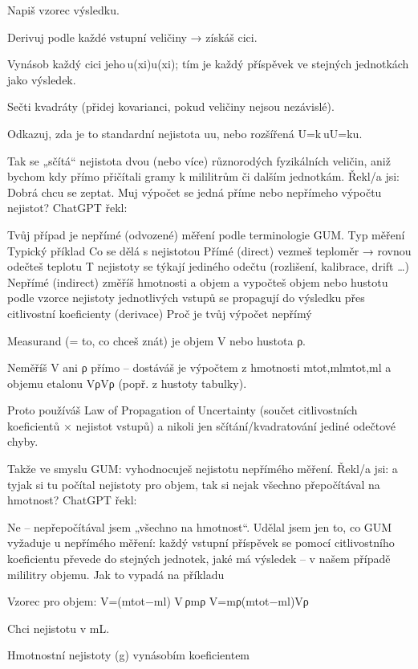 {    Napiš vzorec výsledku.

    Derivuj podle každé vstupní veličiny → získáš cici​.

    Vynásob každý cici​ jeho u(xi)u(xi​); tím je každý příspěvek
    ve stejných jednotkách jako výsledek.

    Sečti kvadráty (přidej kovarianci, pokud veličiny nejsou nezávislé).

    Odkazuj, zda je to standardní nejistota uu, nebo rozšířená U=k uU=ku.

Tak se „sčítá“ nejistota dvou (nebo více) různorodých fyzikálních veličin, aniž bychom kdy přímo přičítali gramy k mililitrům či dalším jednotkám.
Řekl/a jsi:
Dobrá chcu se zeptat. Muj výpočet se jedná příme nebo nepřímeho výpočtu nejistot?
ChatGPT řekl:

Tvůj případ je nepřímé (odvozené) měření podle terminologie GUM.
Typ měření	Typický příklad	Co se dělá s nejistotou
Přímé (direct)	vezmeš teploměr → rovnou odečteš teplotu T	nejistoty se týkají jediného odečtu (rozlišení, kalibrace, drift …)
Nepřímé (indirect)	změříš hmotnosti a objem a vypočteš objem nebo hustotu podle vzorce	nejistoty jednotlivých vstupů se propagují do výsledku přes citlivostní koeficienty (derivace)
Proč je tvůj výpočet nepřímý

    Measurand (= to, co chceš znát) je objem V nebo hustota ρ.

    Neměříš V ani ρ přímo – dostáváš je výpočtem z hmotnosti mtot,mlmtot​,ml​ a objemu etalonu VρVρ​ (popř. z hustoty tabulky).

    Proto používáš Law of Propagation of Uncertainty (součet citlivostních koeficientů × nejistot vstupů) a nikoli jen sčítání/kvadratování jediné odečtové chyby.

Takže ve smyslu GUM: vyhodnocuješ nejistotu nepřímého měření.
Řekl/a jsi:
a tyjak si tu počítal nejistoty pro objem, tak si nejak všechno přepočítával na hmotnost?
ChatGPT řekl:

Ne – nepřepočítával jsem „všechno na hmotnost“.
Udělal jsem jen to, co GUM vyžaduje u nepřímého měření: každý vstupní příspěvek se pomocí citlivostního koeficientu převede do stejných jednotek, jaké má výsledek – v našem případě mililitry objemu.
Jak to vypadá na příkladu

Vzorec pro objem:
V=(mtot−ml)  V ⁣ρmρ
V=mρ​(mtot​−ml​)Vρ​​

    Chci nejistotu v mL.

    Hmotnostní nejistoty (g) vynásobím koeficientem

}
